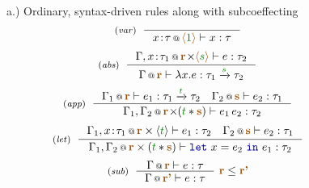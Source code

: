 
\begin{figure}[t]
a.) Ordinary, syntax-driven rules along with subcoeffecting
\begin{equation*}
\tyrule{var}{}
  {\coctx{x \!:\! \tau}{\alift{\cclrd{1}}} \vdash x : \tau}
\end{equation*}
\begin{equation*}
\tyrule{abs}
  {\coctx{\Gamma, x \!:\! \tau_1}{\aclrd{\textbf{r}} \cons \alift{\cclrd{s}}} \vdash e : \tau_2}
  {\coctx{\Gamma}{\aclrd{\textbf{r}}} \vdash \lambda x . e : \tau_1 \xrightarrow{\cclrd{s}} \tau_2}
\end{equation*}
\begin{equation*}
\tyrule{app}
  { \coctx{\Gamma_1}{\aclrd{\textbf{r}}} \vdash e_1 : \tau_1 \xrightarrow{\cclrd{t}} \tau_2 \quad
    \coctx{\Gamma_2}{\aclrd{\textbf{s}}} \vdash e_2 : \tau_1}
  { \coctx{\Gamma_1, \Gamma_2}{\aclrd{\textbf{r}} \cons (\cclrd{t} \ast \aclrd{\textbf{s}})} \vdash e_1 \, e_2 : \tau_2}
\end{equation*}
\begin{equation*}
\tyrule{let}
  { \coctx{\Gamma_1, x \!:\! \tau_1}{\aclrd{\textbf{r}} \times \langle{\cclrd{t}}\rangle} \vdash e_1 : \tau_2 \quad
    \coctx{\Gamma_2}{\aclrd{\textbf{s}}} \vdash e_2 : \tau_1}
  {\coctx{\Gamma_1, \Gamma_2}{\aclrd{\textbf{r}} \times (\cclrd{t} \ast \aclrd{\textbf{s}})} \vdash \kvd{let}~x=e_2~\kvd{in}~e_1 : \tau_2}
\end{equation*}
\begin{equation*}
\tyrule{sub}
  {\coctx{\Gamma}{\aclrd{\textbf{r}}} \vdash e : \tau}
  {\coctx{\Gamma}{\aclrd{\textbf{r'}}} \vdash e : \tau}~\aclrd{\textbf{r}} \leq \aclrd{\textbf{r'}}
\end{equation*}
\vspace{0.5em}


\end{figure}
